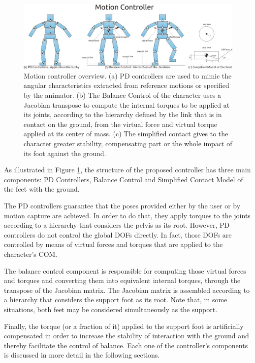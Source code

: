 \documentclass[tog]{acmsiggraph}
\begin{document}
\begin{figure}[tbh]
     \centering
     \includegraphics[width=18.4cm]{images/visaogeral-translate.eps} %
     \caption{Motion controller overview. (a) PD controllers are used to mimic the angular characteristics extracted from reference motions or specified by
the animator. (b) The Balance Control of the character uses a Jacobian transpose to compute the internal torques to be applied at its joints,
according to the hierarchy defined by the link that is in contact on the ground, from the virtual force and virtual torque applied at its center of mass. (c) The simplified
contact gives to the character greater stability, compensating part or the whole impact of its foot against the ground.}
     \label{fig:visaogeral}
\end{figure}

As illustrated in Figure \ref{fig:visaogeral}, the structure of the proposed controller has three main components: PD Controllers, Balance Control
and Simplified Contact Model of the feet with the ground.


The PD controllers guarantee that the poses provided either by the user or by motion capture are achieved. In order to do that, they apply torques
to the joints according to a hierarchy that considers the pelvis as its root. However, PD controllers do not control the global DOFs directly. 
In fact, those DOFs are controlled by means of virtual forces and torques that are applied to the character’s COM.


The balance control component is responsible for computing those virtual forces and torques and converting them into equivalent internal torques,
through the transpose of the Jacobian matrix. The Jacobian matrix is assembled according to a hierarchy that considers the support foot as its 
root. Note that, in some situations, both feet may be considered simultaneously as the support.

Finally, the torque (or a fraction of it) applied to the support foot is artificially compensated in order to increase the stability of 
interaction with the ground and thereby facilitate the control of balance. Each one of the controller’s components is discussed in more 
detail in the following sections.
\end{document}
